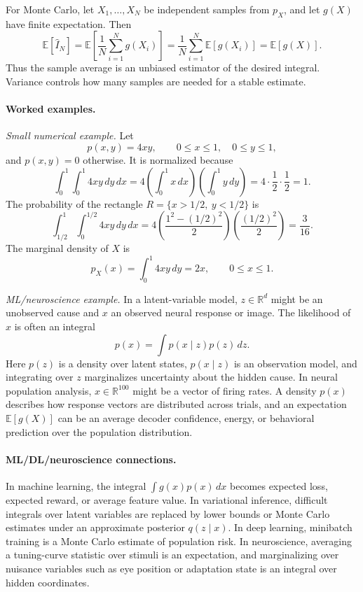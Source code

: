 For Monte Carlo, let \(X_1,\ldots,X_N\) be independent samples from \(p_X\), and let \(g(X)\) have finite expectation. Then
\[
\mathbb{E}[\widehat{I}_N]
=
\mathbb{E}\left[\frac{1}{N}\sum_{i=1}^N g(X_i)\right]
=
\frac{1}{N}\sum_{i=1}^N\mathbb{E}[g(X_i)]
=
\mathbb{E}[g(X)].
\]
Thus the sample average is an unbiased estimator of the desired integral. Variance controls how many samples are needed for a stable estimate.

\paragraph{Worked examples.}
\emph{Small numerical example.} Let
\[
p(x,y)=4xy,\qquad 0\leq x\leq1,\quad 0\leq y\leq1,
\]
and \(p(x,y)=0\) otherwise. It is normalized because
\[
\int_0^1\int_0^1 4xy\,dy\,dx
=
4\left(\int_0^1 x\,dx\right)\left(\int_0^1 y\,dy\right)
=4\cdot\frac{1}{2}\cdot\frac{1}{2}=1.
\]
The probability of the rectangle \(R=\{x>1/2,\ y<1/2\}\) is
\[
\int_{1/2}^{1}\int_0^{1/2}4xy\,dy\,dx
=
4\left(\frac{1^2-(1/2)^2}{2}\right)\left(\frac{(1/2)^2}{2}\right)
=\frac{3}{16}.
\]
The marginal density of \(X\) is
\[
p_X(x)=\int_0^1 4xy\,dy=2x,\qquad 0\leq x\leq1.
\]

\emph{ML/neuroscience example.} In a latent-variable model, \(z\in\mathbb{R}^d\) might be an unobserved cause and \(x\) an observed neural response or image. The likelihood of \(x\) is often an integral
\[
p(x)=\int p(x\mid z)p(z)\,dz.
\]
Here \(p(z)\) is a density over latent states, \(p(x\mid z)\) is an observation model, and integrating over \(z\) marginalizes uncertainty about the hidden cause. In neural population analysis, \(x\in\mathbb{R}^{100}\) might be a vector of firing rates. A density \(p(x)\) describes how response vectors are distributed across trials, and an expectation \(\mathbb{E}[g(X)]\) can be an average decoder confidence, energy, or behavioral prediction over the population distribution.

\paragraph{ML/DL/neuroscience connections.}
In machine learning, the integral \(\int g(x)p(x)\,dx\) becomes expected loss, expected reward, or average feature value. In variational inference, difficult integrals over latent variables are replaced by lower bounds or Monte Carlo estimates under an approximate posterior \(q(z\mid x)\). In deep learning, minibatch training is a Monte Carlo estimate of population risk. In neuroscience, averaging a tuning-curve statistic over stimuli is an expectation, and marginalizing over nuisance variables such as eye position or adaptation state is an integral over hidden coordinates.

